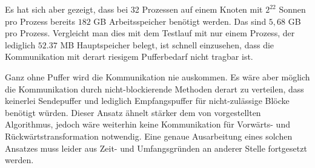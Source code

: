   Es hat sich aber gezeigt, dass bei 32 Prozessen auf einem Knoten mit $2^{22}$ Sonnen pro Prozess bereits $182$ GB Arbeitsspeicher benötigt werden. Das sind $5,68$ GB pro Prozess. Vergleicht man dies
  mit dem Testlauf mit nur einem Prozess, der lediglich $52.37$ MB Hauptspeicher belegt, ist schnell einzusehen, dass die Kommunikation mit derart riesigem Pufferbedarf nicht tragbar ist.
  
  Ganz ohne Puffer wird die Kommunikation nie auskommen. Es wäre aber möglich die Kommunikation durch nicht-blockierende Methoden derart zu verteilen, dass keinerlei Sendepuffer und lediglich 
  Empfangspuffer für nicht-zulässige Blöcke benötigt würden. Dieser Ansatz ähnelt stärker dem von \citet{distrh2} vorgestellten Algorithmus, jedoch wäre weiterhin keine Kommunikation für Vorwärts- und 
  Rückwärtstransformation notwendig. Eine genaue Ausarbeitung eines solchen Ansatzes muss leider aus Zeit- und Umfangsgründen an anderer Stelle fortgesetzt werden.
  
  